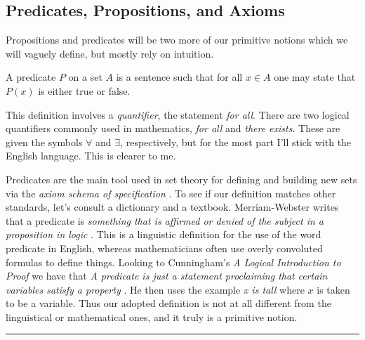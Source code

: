         \subsection{Predicates, Propositions, and Axioms}
            Propositions and predicates will be two more of our primitive
            notions which we will vaguely define, but mostly rely on intuition.
            \begin{definition}
                \label{def:Predicate}%
                A \gls{predicate} $P$ on a \gls{set} $A$ is a sentence such
                that for all $x\in{A}$ one may state that $P(x)$ is either
                true or false.
            \end{definition}
            This definition involves a \textit{quantifier}, the statement
            \textit{for all}. There are two logical quantifiers commonly used
            in mathematics, \textit{for all} and \textit{there exists}. These
            are given the symbols $\forall$ and $\exists$, respectively, but
            for the most part I'll stick with the English language. This is
            clearer to me.
            \par\hfill\par
            Predicates are the main tool used in set theory for defining and
            building new sets via the \textit{axiom schema of specification}%
            . To see if our definition
            matches other standards, let's consult a dictionary and a textbook.
            Merriam-Webster writes that a predicate is
            \textit{something that is affirmed or denied of the subject in a}
            \textit{proposition in logic} \cite{MerriamWebsterPredicateDef}.
            This is a linguistic definition for the use of the word predicate
            in English, whereas mathematicians often use overly convoluted
            formulas to define things. Looking to Cunningham's
            \textit{A Logical Introduction to Proof} we have that
            \textit{A predicate is just a statement proclaiming that}
            \textit{certain variables satisfy a property}
            \cite{Cunningham2010}. He then uses the example \textit{x is tall}
            where $x$ is taken to be a variable. Thus our adopted definition is
            not at all different from the linguistical or mathematical ones,
            and it truly is a primitive notion.
            \par\hfill\par\hrule
